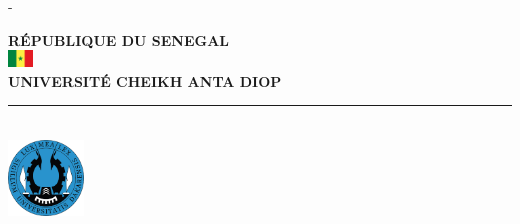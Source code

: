 %
%
% 
%
%
\begin{titlingpage}
	\begin{SingleSpace}
		\calccentering{\unitlength} 
		\begin{adjustwidth*}{\unitlength}{-\unitlength}
			\begin{center}
				{\large \textbf{RÉPUBLIQUE DU SENEGAL} }~\\[0.1cm]
				\includegraphics[width=0.05\textwidth]{Logos/senegal_flag.png}~\\[0.1cm]
				{\large \textbf{\textbf{UNIVERSITÉ CHEIKH ANTA DIOP}} }~\\[0.2cm]
				\vspace{5mm}
				\hrule~\\[0.1cm]
				\vspace{5mm}
				\includegraphics[width=0.15\textwidth]{Logos/logo_ucad.png}~\\[0.1cm]

\end{center}
\end{adjustwidth*}
\end{SingleSpace}
\end{titlingpage}

